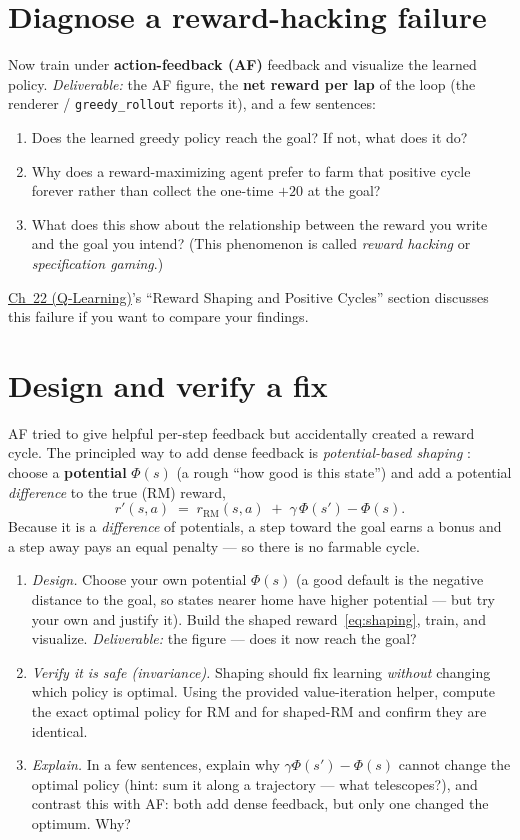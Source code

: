 \documentclass[11pt]{article}
\newcommand{\chql}{\href{https://josephausterweil.github.io/probintro/intro2/22_q_learning/}{Ch~22 (Q-Learning)}}
\begin{document}
\section{Diagnose a reward-hacking failure}
Now train under {\bf action-feedback (AF)} feedback and visualize the learned
policy. {\em Deliverable:} the AF figure, the {\bf net reward per lap} of the loop
(the renderer / \texttt{greedy\_rollout} reports it), and a few sentences:
\begin{enumerate}
\item[(a)] Does the learned greedy policy reach the goal? If not, what does it do?
\item[(b)] Why does a reward-maximizing agent prefer to farm that positive cycle
forever rather than collect the one-time $+20$ at the goal?
\item[(c)] What does this show about the relationship between the reward you write
and the goal you intend? (This phenomenon is called {\em reward hacking} or {\em
specification gaming}.)
\end{enumerate}
\chql{}'s ``Reward Shaping and Positive Cycles'' section discusses this failure if
you want to compare your findings.

\section{Design and verify a fix}
AF tried to give helpful per-step feedback but accidentally created a reward cycle.
The principled way to add dense feedback is {\em potential-based shaping}
\citep*{ng99}: choose a {\bf potential} $\Phi(s)$ (a rough ``how good is this
state'') and add a potential {\em difference} to the true (RM) reward,
\begin{equation}
r'(s,a) \;=\; r_{\text{RM}}(s,a) \;+\; \gamma\,\Phi(s') - \Phi(s).
\label{eq:shaping}
\end{equation}
Because it is a {\em difference} of potentials, a step toward the goal earns a bonus
and a step away pays an equal penalty --- so there is no farmable cycle.

\begin{enumerate}
\item[(a)] {\em Design.} Choose your own potential $\Phi(s)$ (a good default is the
negative distance to the goal, so states nearer home have higher potential --- but
try your own and justify it). Build the shaped reward~\eqref{eq:shaping}, train, and
visualize. {\em Deliverable:} the figure --- does it now reach the goal?
\item[(b)] {\em Verify it is safe (invariance).} Shaping should fix learning {\em
without} changing which policy is optimal. Using the provided value-iteration
helper, compute the exact optimal policy for RM and for shaped-RM and confirm they
are identical.
\item[(c)] {\em Explain.} In a few sentences, explain why $\gamma\Phi(s')-\Phi(s)$
cannot change the optimal policy (hint: sum it along a trajectory --- what
telescopes?), and contrast this with AF: both add dense feedback, but only one
changed the optimum. Why?
\end{enumerate}
\end{document}
